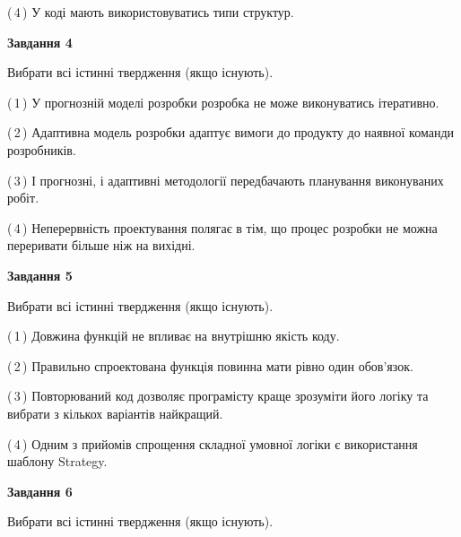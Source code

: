 \documentclass[10pt, ukrainian]{article}
\begin{document}
{\begin {large}
(\,4\,) У коді мають використовуватись типи структур. %


{\begin {center}\textbf{Завдання 4}\end {center}}\par
Вибрати всі істинні твердження (якщо існують).\par
\vspace{2mm}



(\,1\,) У прогнозній моделі розробки розробка не може виконуватись ітеративно. %



(\,2\,) Адаптивна модель розробки адаптує вимоги до продукту до наявної команди розробників. %



(\,3\,) І прогнозні, і адаптивні методології передбачають планування виконуваних робіт. %



(\,4\,) Неперервність проектування полягає в тім, що процес розробки не можна переривати більше ніж на вихідні. %


{\begin {center}\textbf{Завдання 5}\end {center}}\par
Вибрати всі істинні твердження (якщо існують).\par
\vspace{2mm}



(\,1\,) Довжина функцій не впливає на внутрішню якість коду. %



(\,2\,) Правильно спроектована функція повинна мати рівно один обов'язок. %



(\,3\,) Повторюваний код дозволяє програмісту краще зрозуміти його логіку та вибрати з кількох варіантів найкращий. %



(\,4\,) Одним з прийомів спрощення складної умовної логіки є використання шаблону Strategy. %

\newpage

{\begin {center}\textbf{Завдання 6}\end {center}}\par
Вибрати всі істинні твердження (якщо існують).\par
\vspace{2mm}




\end{large}}
\end{document}
